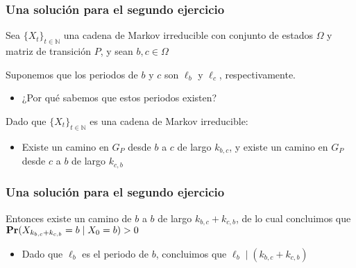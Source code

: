 \begin{frame}
\frametitle{Una solución para el segundo ejercicio}

{\small

Sea $\{ X_t \}_{t \in \mathbb{N}}$ una cadena de Markov irreducible con conjunto de estados $\Omega$ y matriz de transición $P$, y sean $b,c \in \Omega$


Suponemos que los periodos de $b$ y $c$ son $\ell_b$ y $\ell_c$, respectivamente.
\begin{itemize}
\item ¿Por qué sabemos que estos periodos existen?
\end{itemize}


Dado que $\{ X_t \}_{t \in \mathbb{N}}$ es una cadena de Markov irreducible:
\begin{itemize}
\item Existe un camino en $G_P$ desde $b$ a $c$ de largo $k_{b,c}$, y existe un camino en $G_P$ desde $c$ a $b$ de largo $k_{c,b}$
\end{itemize}

}

\end{frame}

\begin{frame}
\frametitle{Una solución para el segundo ejercicio}

{\small

Entonces existe un camino de $b$ a $b$ de largo $k_{b,c} + k_{c,b}$, de lo cual concluimos que ${\rm {\bf Pr}}(X_{k_{b,c} + k_{c,b}} = b \mid X_0 = b) > 0$
\begin{itemize}
\item Dado que $\ell_b$ es el periodo de $b$, concluimos que $\ell_b \mid (k_{b,c} + k_{c,b})$
\end{itemize}





}

\end{frame}


